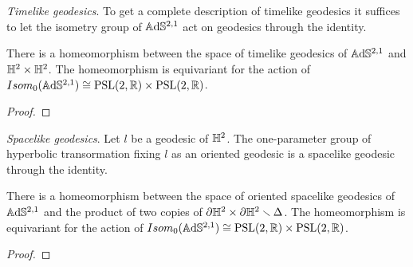 \noindent\textit{Timelike geodesics}.
To get a complete description of timelike geodesics it suffices to let the isometry group of $\mathbb{A}\mathrm{d}\mathbb{S}^{2,1}$ act on geodesics through the identity.
\begin{proposition}
    There is a homeomorphism between the space of timelike geodesics of $\mathbb{A}\mathrm{d}\mathbb{S}^{2,1}$ and $\mathbb{H}^2 \times \mathbb{H}^2$.
    The homeomorphism is equivariant for the action of $Isom_0(\mathbb{A}\mathrm{d}\mathbb{S}^{2,1}) \cong \text{PSL}(2,\mathbb{R}) \times \text{PSL}(2,\mathbb{R})$.
\end{proposition}
\begin{proof}
\end{proof}

\noindent\textit{Spacelike geodesics}.
Let $l$ be a geodesic of $\mathbb{H}^2$. The one-parameter group of hyperbolic transormation fixing $l$ as an oriented geodesic is a spacelike geodesic through the identity.
\begin{proposition}
    There is a homeomorphism between the space of oriented spacelike geodesics of $\mathbb{A}\mathrm{d}\mathbb{S}^{2,1}$ and the product of two copies of $\partial \mathbb{H}^2 \times \partial \mathbb{H}^2 \smallsetminus \Delta$. 
    The homeomorphism is equivariant for the action of $Isom_0(\mathbb{A}\mathrm{d}\mathbb{S}^{2,1}) \cong \text{PSL}(2,\mathbb{R}) \times \text{PSL}(2,\mathbb{R})$.
\end{proposition}
\begin{proof}
\end{proof}